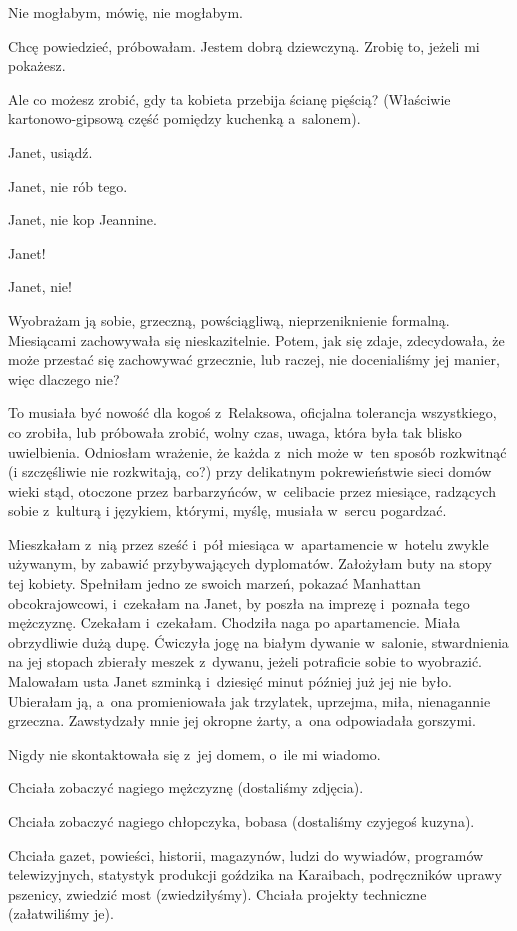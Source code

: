 \documentclass[oneside,polish,12pt,sfheadings]{mwbk}
\begin{document}
Nie mogłabym, mówię, nie mogłabym.

Chcę powiedzieć, próbowałam. Jestem dobrą dziewczyną. Zrobię to, jeżeli
mi pokażesz.

Ale co możesz zrobić, gdy ta kobieta przebija ścianę pięścią? (Właściwie
kartonowo-gipsową część pomiędzy kuchenką a~salonem).

Janet, usiądź.

Janet, nie rób tego.

Janet, nie kop Jeannine.

Janet!

Janet, nie!

Wyobrażam ją sobie, grzeczną, powściągliwą, nieprzeniknienie formalną.
Miesiącami zachowywała się nieskazitelnie. Potem, jak się zdaje, zdecydowała,
że może przestać się zachowywać grzecznie, lub raczej, nie docenialiśmy
jej manier, więc dlaczego nie?

To musiała być nowość dla kogoś z~Relaksowa, oficjalna tolerancja
wszystkiego, co zrobiła, lub próbowała zrobić, wolny czas, uwaga,
która była tak blisko uwielbienia. Odniosłam wrażenie, że każda z~nich może w~ten sposób rozkwitnąć (i szczęśliwie nie rozkwitają, co?)
przy delikatnym pokrewieństwie sieci domów wieki stąd, otoczone przez
barbarzyńców, w~celibacie przez miesiące, radzących sobie z~kulturą
i językiem, którymi, myślę, musiała w~sercu pogardzać.

Mieszkałam z~nią przez sześć i~pół miesiąca w~apartamencie w~hotelu
zwykle używanym, by zabawić przybywających dyplomatów. Założyłam buty
na stopy tej kobiety. Spełniłam jedno ze swoich marzeń, pokazać Manhattan
obcokrajowcowi, i~czekałam na Janet, by poszła na imprezę i~poznała
tego mężczyznę. Czekałam i~czekałam. Chodziła naga po apartamencie.
Miała obrzydliwie dużą dupę. Ćwiczyła jogę na białym dywanie w~salonie,
stwardnienia na jej stopach zbierały meszek z~dywanu, jeżeli potraficie
sobie to wyobrazić. Malowałam usta Janet szminką i~dziesięć minut
później już jej nie było. Ubierałam ją, a~ona promieniowała jak trzylatek,
uprzejma, miła, nienagannie grzeczna. Zawstydzały mnie jej okropne
żarty, a~ona odpowiadała gorszymi.

Nigdy nie skontaktowała się z~jej domem, o~ile mi wiadomo.

Chciała zobaczyć nagiego mężczyznę (dostaliśmy zdjęcia).

Chciała zobaczyć nagiego chłopczyka, bobasa (dostaliśmy czyjegoś kuzyna).

Chciała gazet, powieści, historii, magazynów, ludzi do wywiadów, programów
telewizyjnych, statystyk produkcji goździka na Karaibach, podręczników
uprawy pszenicy, zwiedzić most (zwiedziłyśmy). Chciała projekty techniczne
(załatwiliśmy je).
\end{document}
